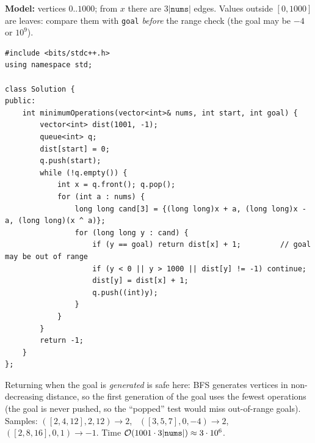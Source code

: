 \begin{solutionbox}
\textbf{Model:} vertices $0..1000$; from $x$ there are $3|\texttt{nums}|$ edges. Values outside $[0, 1000]$ are leaves: compare them with \texttt{goal} \emph{before} the range check (the goal may be $-4$ or $10^9$).
\begin{lstlisting}[style=cpp]
#include <bits/stdc++.h>
using namespace std;

class Solution {
public:
    int minimumOperations(vector<int>& nums, int start, int goal) {
        vector<int> dist(1001, -1);
        queue<int> q;
        dist[start] = 0;
        q.push(start);
        while (!q.empty()) {
            int x = q.front(); q.pop();
            for (int a : nums) {
                long long cand[3] = {(long long)x + a, (long long)x - a, (long long)(x ^ a)};
                for (long long y : cand) {
                    if (y == goal) return dist[x] + 1;         // goal may be out of range
                    if (y < 0 || y > 1000 || dist[y] != -1) continue;
                    dist[y] = dist[x] + 1;
                    q.push((int)y);
                }
            }
        }
        return -1;
    }
};
\end{lstlisting}
Returning when the goal is \emph{generated} is safe here: BFS generates vertices in non-decreasing distance, so the first generation of the goal uses the fewest operations (the goal is never pushed, so the ``popped'' test would miss out-of-range goals). Samples: $([2,4,12], 2, 12) \to 2$, \ $([3,5,7], 0, -4) \to 2$, \ $([2,8,16], 0, 1) \to -1$. Time $\mathcal{O}(1001 \cdot 3|\texttt{nums}|) \approx 3\cdot10^6$.
\end{solutionbox}

